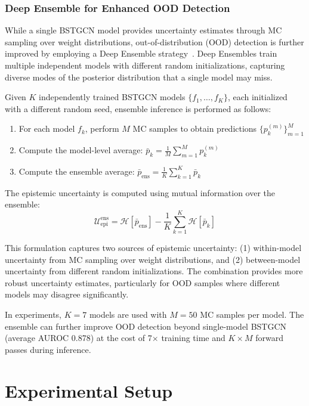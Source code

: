 \documentclass[lettersize,journal]{IEEEtran}
\begin{document}
\subsubsection{Deep Ensemble for Enhanced OOD Detection}

While a single BSTGCN model provides uncertainty estimates through MC sampling over weight distributions, out-of-distribution (OOD) detection is further improved by employing a Deep Ensemble strategy~\cite{Lakshminarayanan2017Ensemble}. Deep Ensembles train multiple independent models with different random initializations, capturing diverse modes of the posterior distribution that a single model may miss.

Given $K$ independently trained BSTGCN models $\{f_1, \ldots, f_K\}$, each initialized with a different random seed, ensemble inference is performed as follows:
\begin{enumerate}
\item For each model $f_k$, perform $M$ MC samples to obtain predictions $\{p_k^{(m)}\}_{m=1}^M$
\item Compute the model-level average: $\bar{p}_k = \frac{1}{M} \sum_{m=1}^M p_k^{(m)}$
\item Compute the ensemble average: $\bar{p}_{\text{ens}} = \frac{1}{K} \sum_{k=1}^K \bar{p}_k$
\end{enumerate}

The epistemic uncertainty is computed using mutual information over the ensemble:
\begin{equation}
\mathcal{U}_{\text{epi}}^{\text{ens}} = \mathcal{H}[\bar{p}_{\text{ens}}] - \frac{1}{K} \sum_{k=1}^K \mathcal{H}[\bar{p}_k]
\end{equation}

This formulation captures two sources of epistemic uncertainty: (1) within-model uncertainty from MC sampling over weight distributions, and (2) between-model uncertainty from different random initializations. The combination provides more robust uncertainty estimates, particularly for OOD samples where different models may disagree significantly.

In experiments, $K=7$ models are used with $M=50$ MC samples per model. The ensemble can further improve OOD detection beyond single-model BSTGCN (average AUROC 0.878) at the cost of 7$\times$ training time and $K \times M$ forward passes during inference.

\section{Experimental Setup}
\end{document}
